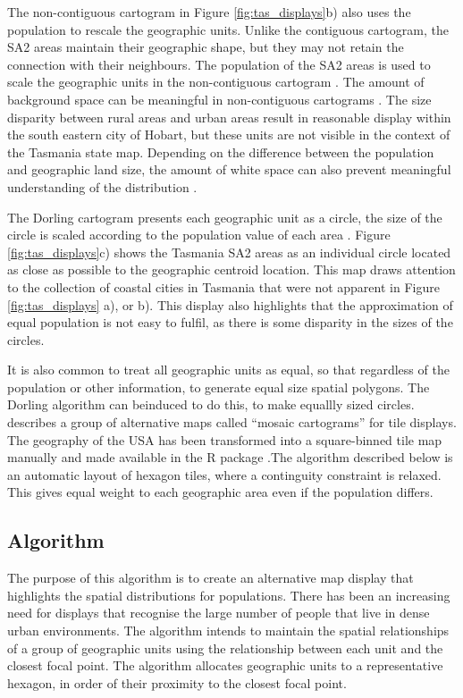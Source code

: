The non-contiguous cartogram in Figure \ref{fig:tas_displays}b) also
uses the population to rescale the geographic units. Unlike the
contiguous cartogram, the SA2 areas maintain their geographic shape, but
they may not retain the connection with their neighbours. The population
of the SA2 areas is used to scale the geographic units in the
non-contiguous cartogram \citep{NAC}. The amount of background space can
be meaningful in non-contiguous cartograms \citep{ECGC}. The size
disparity between rural areas and urban areas result in reasonable
display within the south eastern city of Hobart, but these units are not
visible in the context of the Tasmania state map. Depending on the
difference between the population and geographic land size, the amount
of white space can also prevent meaningful understanding of the
distribution \citep{TVSSS}.

The Dorling cartogram presents each geographic unit as a circle, the
size of the circle is scaled according to the population value of each
area \citep{ACTUC}. Figure \ref{fig:tas_displays}c) shows the Tasmania
SA2 areas as an individual circle located as close as possible to the
geographic centroid location. This map draws attention to the collection
of coastal cities in Tasmania that were not apparent in Figure
\ref{fig:tas_displays} a), or b). This display also highlights that the
approximation of equal population is not easy to fulfil, as there is
some disparity in the sizes of the circles.

It is also common to treat all geographic units as equal, so that
regardless of the population or other information, to generate equal
size spatial polygons. The Dorling algorithm can beinduced to do this,
to make equallly sized circles. \citet{MDAC} describes a group of
alternative maps called ``mosaic cartograms'' for tile displays. The
geography of the USA has been transformed into a square-binned tile map
manually and made available in the R package 
\citep{statebins}.The algorithm described below is an automatic layout
of hexagon tiles, where a continguity constraint is relaxed. This gives
equal weight to each geographic area even if the population differs.

\hypertarget{algorithm}{%
\subsection{Algorithm}\label{algorithm}}

The purpose of this algorithm is to create an alternative map display
that highlights the spatial distributions for populations. There has
been an increasing need for displays that recognise the large number of
people that live in dense urban environments. The algorithm intends to
maintain the spatial relationships of a group of geographic units using
the relationship between each unit and the closest focal point. The
algorithm allocates geographic units to a representative hexagon, in
order of their proximity to the closest focal point.

